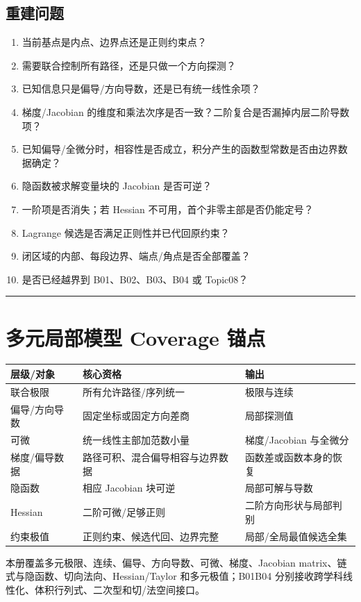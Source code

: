 \documentclass[11pt,a4paper,fontset=fandol]{ctexart}
\begin{document}
\subsection{重建问题}
\begin{enumerate}
  \item 当前基点是内点、边界点还是正则约束点？
  \item 需要联合控制所有路径，还是只做一个方向探测？
  \item 已知信息只是偏导/方向导数，还是已有统一线性余项？
  \item 梯度/Jacobian 的维度和乘法次序是否一致？二阶复合是否漏掉内层二阶导数项？
  \item 已知偏导/全微分时，相容性是否成立，积分产生的函数型常数是否由边界数据确定？
  \item 隐函数被求解变量块的 Jacobian 是否可逆？
  \item 一阶项是否消失；若 Hessian 不可用，首个非零主部是否仍能定号？
  \item Lagrange 候选是否满足正则性并已代回原约束？
  \item 闭区域的内部、每段边界、端点/角点是否全部覆盖？
  \item 是否已经越界到 B01、B02、B03、B04 或 Topic08？
\end{enumerate}

\begin{center}\rule{0.5\linewidth}{0.5pt}\end{center}
\appendix
\section{多元局部模型 Coverage 锚点}
\begin{center}
\begin{tabular}{L{2.55cm}L{5.15cm}L{\dimexpr\linewidth-7.70cm\relax}}
\toprule
层级/对象 & 核心资格 & 输出\\
\midrule
联合极限 & 所有允许路径/序列统一 & 极限与连续\\
偏导/方向导数 & 固定坐标或固定方向差商 & 局部探测值\\
可微 & 统一线性主部加范数小量 & 梯度/Jacobian 与全微分\\
梯度/偏导数据 & 路径可积、混合偏导相容与边界数据 & 函数差或函数本身的恢复\\
隐函数 & 相应 Jacobian 块可逆 & 局部可解与导数\\
Hessian & 二阶可微/足够正则 & 二阶方向形状与局部判别\\
约束极值 & 正则约束、候选代回、边界完整 & 局部/全局最值候选全集\\
\bottomrule
\end{tabular}
\end{center}

本册覆盖多元极限、连续、偏导、方向导数、可微、梯度、Jacobian matrix、链式与隐函数、切向法向、Hessian/Taylor 和多元极值；B01\textendash{}B04 分别接收跨学科线性化、体积行列式、二次型和切/法空间接口。
\end{document}
